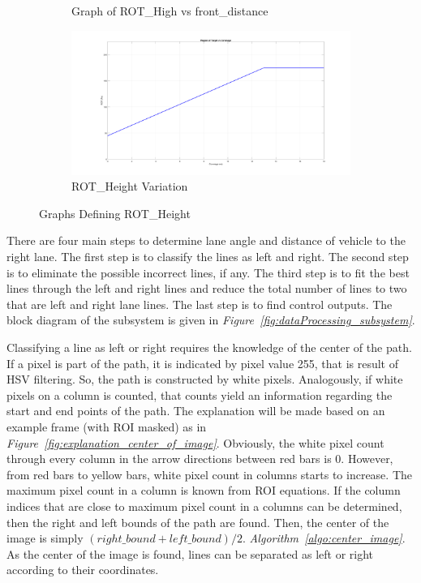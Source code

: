 \documentclass[a4paper,12pt]{article}
\begin{document}
\begin{enumerate}[A.]
\begin{figure}[t!]
\begin{subfigure}{.46\textwidth}
		\caption{ Graph of ROT\_High vs front\_distance}
		
	\end{subfigure}%
	\begin{subfigure}{.46\textwidth}
		
		\centering
		
		\includegraphics[width=0.44\unitlength]{images/ROT_ROI/ROT}
		
		\caption{ ROT\_Height Variation}
		
	\end{subfigure}
	
	\caption{\label{fig:ROT_crop} Graphs Defining ROT\_Height}
	
\end{figure}
There are four main steps to determine lane angle and distance of vehicle to the right lane. The first step is to classify the lines as left and right. The second step is to eliminate the possible incorrect lines, if any. The third step is to fit the best lines through the left and right lines and reduce the total number of lines to two that are left and right lane lines. The last step is to find control outputs. The block diagram of the subsystem is given in \textit{Figure~\ref{fig:dataProcessing_subsystem}}.

Classifying a line as left or right requires the knowledge of the center of the path. If a pixel is part of the path, it is indicated by pixel value 255, that is result of HSV filtering. So, the path is constructed by white pixels. Analogously, if white pixels on a column is counted, that counts yield an information regarding the start and end points of the path. The explanation will be made based on an example frame (with ROI masked) as in \textit{Figure~\ref{fig:explanation_center_of_image}}. Obviously, the white pixel count through every column in the arrow directions between red bars is 0. However, from red bars to yellow bars, white pixel count in columns starts to increase. The maximum pixel count in a column is known from ROI equations. If the column indices that are close to maximum pixel count in a columns can be determined, then the right and left bounds of the path are found. Then, the center of the image is simply $(right\_bound + left\_bound)/2$. \textit{Algorithm~\ref{algo:center_image}}. As the center of the image is found, lines can be separated as left or right according to their coordinates.


\end{enumerate}
\end{document}
